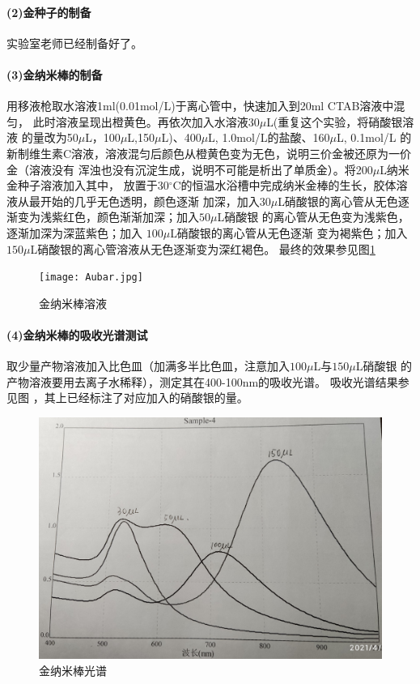 \documentclass[a4paper,zihao=5,UTF8]{ctexart}
\newcommand{\mr}[1]{\mathrm{#1}}
\def\celsius{^{\circ}\mr{C}}
\begin{document}
    \paragraph{(2)金种子的制备}
    实验室老师已经制备好了。
    \paragraph{(3)金纳米棒的制备}
    用移液枪取水溶液1ml(0.01mol/L)于离心管中，快速加入到20ml CTAB溶液中混匀，
    此时溶液呈现出橙黄色。再依次加入水溶液$30\mu$L(重复这个实验，将硝酸银溶液
    的量改为50$\mu$L，100$\mu$L,150$\mu$L)、400$\mu$L, 1.0mol/L的盐酸、160$\mu$L, 0.1mol/L
    的新制维生素C溶液，溶液混匀后颜色从橙黄色变为无色，说明三价金被还原为一价金（溶液没有
    浑浊也没有沉淀生成，说明不可能是析出了单质金）。将200$\mu$L纳米金种子溶液加入其中，
    放置于30$\celsius$的恒温水浴槽中完成纳米金棒的生长，胶体溶液从最开始的几乎无色透明，颜色逐渐
    加深，加入$30\mu$L硝酸银的离心管从无色逐渐变为浅紫红色，颜色渐渐加深；加入$50\mu$L硝酸银
    的离心管从无色变为浅紫色，逐渐加深为深蓝紫色；加入 $100\mu$L硝酸银的离心管从无色逐渐
    变为褐紫色；加入$150\mu$L硝酸银的离心管溶液从无色逐渐变为深红褐色。
    最终的效果参见图\ref{Au nano bar}
    \begin{figure}[htbp]
        \centering
        \texttt{[image: Aubar.jpg]}
        \caption{金纳米棒溶液}
        \label{Au nano bar}
    \end{figure}
    \paragraph{(4)金纳米棒的吸收光谱测试}
    取少量产物溶液加入比色皿（加满多半比色皿，注意加入$100\mu$L与$150\mu$L硝酸银
    的产物溶液要用去离子水稀释），测定其在400-100nm的吸收光谱。
    吸收光谱结果参见图 ，其上已经标注了对应加入的硝酸银的量。
    \begin{figure}
        \centering
        \includegraphics[scale=0.1]{spectrum.jpg}
        \caption{金纳米棒光谱}
        \label{spectrum of Au nano}
    \end{figure}
\end{document}
